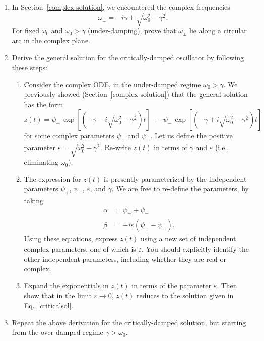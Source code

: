 \documentclass[10pt,a4paper]{article}
\begin{document}
\begin{enumerate}
\item
In Section~\ref{complex-solution}, we encountered the complex
frequencies
\begin{equation}
  \omega_\pm = -i\gamma \pm \sqrt{\omega_0^2 - \gamma^2}.
\end{equation}
For fixed $\omega_0$ and $\omega_0 > \gamma$ (under-damping), prove
that $\omega_\pm$ lie along a circular arc in the complex plane.

\item
Derive the general solution for the critically-damped oscillator by
following these steps:
\begin{enumerate}
\item
Consider the complex ODE, in the under-damped regime $\omega_0 >
\gamma$. We previously showed (Section~\ref{complex-solution}) that
the general solution has the form
\begin{equation*}
  z(t) = \psi_+ \,
\exp\left[\left(-\gamma - i \sqrt{\omega_0^2 -
    \gamma^2}\right)t\right] \; +\; \psi_- \, \exp\left[\left(-\gamma
  +i\sqrt{\omega_0^2 - \gamma^2}\right)t\right]
\end{equation*}
for some complex parameters $\psi_+$ and $\psi_-$. Let us define the
positive parameter $\varepsilon = \sqrt{\omega_0^2 - \gamma^2}$.
Re-write $z(t)$ in terms of $\gamma$ and $\varepsilon$ (i.e.,
eliminating $\omega_0$).

\item
  The expression for $z(t)$ is presently parameterized by the
independent parameters $\psi_+$, $\psi_-$, $\varepsilon$, and
$\gamma$. We are free to re-define the parameters, by
taking
\begin{align}
  \alpha &= \psi_+ + \psi_- \\
  \beta &= -i\varepsilon(\psi_+ - \psi_-).
\end{align}
Using these equations, express $z(t)$ using a new set of independent
complex parameters, one of which is $\varepsilon$. You should
explicitly identify the other independent parameters, including
whether they are real or complex.

\item Expand the exponentials in $z(t)$ in terms of the parameter
  $\varepsilon$. Then show that in the limit $\varepsilon \rightarrow
  0$, $z(t)$ reduces to the solution given in Eq.~\eqref{criticalsol}.
\end{enumerate}

\item
  Repeat the above derivation for the critically-damped solution, but
  starting from the over-damped regime $\gamma > \omega_0$.


\end{enumerate}
\end{document}
